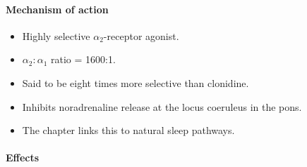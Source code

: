\documentclass[11pt,a4paper]{article}
\begin{document}
\paragraph{Mechanism of action}
\begin{itemize}
  \item Highly selective $\alpha_2$-receptor agonist.
  \item $\alpha_2:\alpha_1$ ratio = 1600:1.
  \item Said to be eight times more selective than clonidine.
  \item Inhibits noradrenaline release at the locus coeruleus in the pons.
  \item The chapter links this to natural sleep pathways.
\end{itemize}

\paragraph{Effects}
\end{document}
